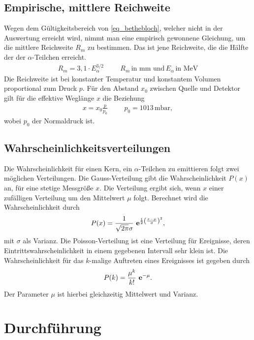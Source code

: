\subsection{Empirische, mittlere Reichweite}
Wegen dem Gültigkeitsbereich von \eqref{eq_bethebloch}, welcher nicht in der Auswertung erreicht wird, nimmt man eine empirisch gewonnene
Gleichung, um die mittlere Reichweite $R_m$ zu bestimmen. Das ist jene Reichweite, die die Hälfte der der $\alpha$-Teilchen erreicht.
\begin{align}
 R_m = 3,1\cdot E^{3/2}_\alpha  \hspace{1cm} R_m \, \text{in mm und}\, E_\alpha\, \text{in MeV}
 \label{eq_reichweite_empirisch}
\end{align}
Die Reichweite ist bei konstanter Temperatur und konstantem Volumen proportional zum Druck $p$. Für den Abstand $x_0$ zwischen Quelle und Detektor
gilt für die effektive Weglänge $x$ die Beziehung
\begin{align}
 x = x_0 \frac{p}{p_0} \hspace{1cm} p_0 = 1013\, \text{mbar},
 \label{eq_reichweite_auswertung}
\end{align}
wobei $p_0$ der Normaldruck ist. 

\subsection{Wahrscheinlichkeitsverteilungen}
Die Wahrscheinlichkeit für einen Kern, ein $\alpha$-Teilchen zu emittieren folgt zwei möglichen Verteilungen. Die Gauss-Verteilung gibt
die Wahrscheinlichkeit $P(x)$ an, für eine stetige Messgröße $x$. Die Verteilung ergibt sich, wenn $x$ einer zufälligen Verteilung um den Mittelwert
$\mu$ folgt. Berechnet wird die Wahrscheinlichkeit durch
\begin{align}
 P(x) = \frac{1}{\sqrt{2\pi}\sigma} \ \mathbf{e}^{\frac12\left(\frac{x-\mu}{\sigma} \right)^2},
 \label{eq_gauss}
\end{align}
mit $\sigma$ als Varianz. Die Poisson-Verteilung ist eine Verteilung für Ereignisse, deren Eintrittswahrscheinlichkeit in einem gegebenen
Intervall sehr klein ist. Die Wahrscheinlichkeit für das $k$-malige Auftreten eines Ereignisses ist gegeben durch
\begin{align}
 P(k) = \frac{\mu^k}{k!}\ \mathbf{e}^{-\mu}.
 \label{eq_poisson}
\end{align}
Der Parameter $\mu$ ist hierbei gleichzeitig Mittelwert und Varianz.

\section{Durchführung}
